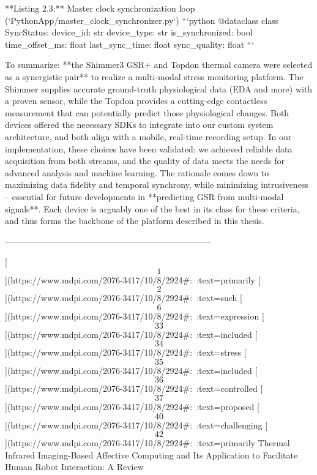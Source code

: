 \documentclass[12pt,a4paper]{article}
\begin{document}
**Listing 2.3:** Master clock synchronization loop (`PythonApp/master_clock_synchronizer.py`)
```python
@dataclass
class SyncStatus:
    device_id: str
    device_type: str
    is_synchronized: bool
    time_offset_ms: float
    last_sync_time: float
    sync_quality: float
```

To summarize: **the Shimmer3 GSR+ and Topdon thermal camera were
selected as a synergistic pair** to realize a multi-modal stress
monitoring platform. The Shimmer supplies accurate ground-truth
physiological data (EDA and more) with a proven sensor, while the Topdon
provides a cutting-edge contactless measurement that can potentially
predict those physiological changes. Both devices offered the necessary
SDKs to integrate into our custom system architecture, and both align
with a mobile, real-time recording setup. In our implementation, these
choices have been validated: we achieved reliable data acquisition from
both streams, and the quality of data meets the needs for advanced
analysis and machine learning. The rationale comes down to maximizing
data fidelity and temporal synchrony, while minimizing intrusiveness --
essential for future developments in **predicting GSR from multi-modal
signals**. Each device is arguably one of the best in its class for
these criteria, and thus forms the backbone of the platform described in
this thesis.

------------------------------------------------------------------------

[\[1\]](https://www.mdpi.com/2076-3417/10/8/2924#:~:text=primarily%
[\[2\]](https://www.mdpi.com/2076-3417/10/8/2924#:~:text=such%
[\[6\]](https://www.mdpi.com/2076-3417/10/8/2924#:~:text=expression%
[\[33\]](https://www.mdpi.com/2076-3417/10/8/2924#:~:text=included%
[\[34\]](https://www.mdpi.com/2076-3417/10/8/2924#:~:text=stress%
[\[35\]](https://www.mdpi.com/2076-3417/10/8/2924#:~:text=included%
[\[36\]](https://www.mdpi.com/2076-3417/10/8/2924#:~:text=controlled%
[\[37\]](https://www.mdpi.com/2076-3417/10/8/2924#:~:text=proposed%
[\[40\]](https://www.mdpi.com/2076-3417/10/8/2924#:~:text=challenging%
[\[42\]](https://www.mdpi.com/2076-3417/10/8/2924#:~:text=primarily%
Thermal Infrared Imaging-Based Affective Computing and Its Application
to Facilitate Human Robot Interaction: A Review
\end{document}
